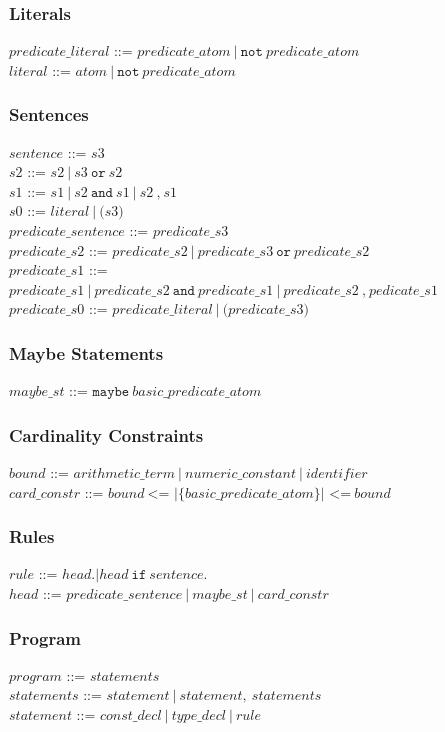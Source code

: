 \documentclass[a4paper,10pt]{article}
\begin{document}
\subsubsection{Literals}
$predicate\_literal$ ::= $predicate\_atom~|~\texttt{not}~predicate\_atom$\\
$literal$ ::= $atom~|~\texttt{not}~predicate\_atom$


\subsubsection{Sentences}
$sentence$ ::= $s3$ \\
$s2$ ::= $s2~|~s3~\texttt{or}~s2$\\
$s1$ ::= $s1~|~s2~\texttt{and}~s1~|~s2~\texttt{,}~s1$
\\
$s0$ ::= $literal~|~\texttt{(}s3\texttt{)}$ \\
$predicate\_sentence$ ::= $predicate\_s3$ \\
$predicate\_s2$ ::= $predicate\_s2~|~predicate\_s3~\texttt{or}~predicate\_s2$\\
$predicate\_s1$ ::= $predicate\_s1~|~predicate\_s2~\texttt{and}~predicate\_s1~|~predicate\_s2~\texttt{,}~pedicate\_s1$
\\
$predicate\_s0$ ::= $predicate\_literal~|~\texttt{(}predicate\_s3\texttt{)}$ 


\subsubsection{Maybe Statements}
$maybe\_st$ ::= $\texttt{maybe}~basic\_predicate\_atom$\\
\subsubsection{Cardinality Constraints}
$bound$ ::= $arithmetic\_term~|~numeric\_constant~|~identifier$\\
$card\_constr$ ::= $bound~ \texttt{<= |\{}  basic\_predicate\_atom \texttt{\}| <=} ~bound$\\

\subsubsection{Rules}
$rule$ ::= $head \texttt{.} | head~\texttt{if}~sentence \texttt{.} $ \\
$head$ ::= $predicate\_sentence~|~maybe\_st~|~card\_constr$
 
\subsubsection{Program}
$program$ ::= $statements$\\
$statements$ ::= $statement~|~statement,~statements$\\
$statement$ ::= $ const\_decl~|~type\_decl~|~rule$ 
\end{document}
